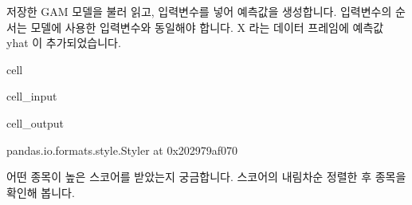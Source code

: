 \documentclass[letterpaper,10pt,english]{jupyterBook}
\begin{document}
\sphinxAtStartPar
 저장한 GAM 모델을 불러 읽고, 입력변수를 넣어 예측값을 생성합니다. 입력변수의 순서는 모델에 사용한 입력변수와 동일해야 합니다. X 라는 데이터 프레임에 예측값 yhat 이 추가되었습니다.

\begin{sphinxuseclass}{cell}\begin{sphinxVerbatimInput}

\begin{sphinxuseclass}{cell_input}
\begin{sphinxVerbatim}[commandchars=\\\{\}]
 
    
           
    
  \PYG{p}{[}\PYG{p}{]}
\PYG{p}{[}\PYG{p}{]}  
\end{sphinxVerbatim}

\end{sphinxuseclass}\end{sphinxVerbatimInput}
\begin{sphinxVerbatimOutput}

\begin{sphinxuseclass}{cell_output}
\begin{sphinxVerbatim}[commandchars=\\\{\}]
\PYGZlt{}pandas.io.formats.style.Styler at 0x202979af070\PYGZgt{}
\end{sphinxVerbatim}

\end{sphinxuseclass}\end{sphinxVerbatimOutput}

\end{sphinxuseclass}
\sphinxAtStartPar
 어떤 종목이 높은 스코어를 받았는지 궁금합니다. 스코어의 내림차순 정렬한 후 종목을 확인해 봅니다.
\end{document}
